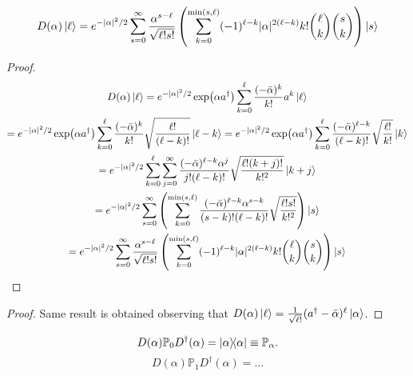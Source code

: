 \documentclass[a4paper]{report}
\newcommand{\PP}{\mathbb{P}}
\begin{document}
\begin{prop}
	\begin{equation}
		D(\alpha) \ket \ell
		= e^{-|\alpha|^2/2}
		\sum_{s=0}^\infty \frac{\alpha^{s-\ell}}{\sqrt{\ell!s!}}
		\left(
		\sum_{k=0}^{\min(s,\ell)}
		(-1)^{\ell-k}|\alpha|^{2(\ell-k)} k!\binom{\ell}{k}\binom{s}{k}
		\right)
		\ket{s}
	\end{equation}
\end{prop}

\begin{proof}
	\begin{equation}
	\begin{gathered}
		D(\alpha) \ket \ell
		= e^{-|\alpha|^2/2}
		\exp(\alpha a^\dagger) 
		\sum_{k=0}^\ell \frac{(-\bar\alpha)^k}{k!} a^k \ket\ell \\
		= e^{-|\alpha|^2/2}
		\exp(\alpha a^\dagger) 
		\sum_{k=0}^\ell \frac{(-\bar\alpha)^k}{k!} \sqrt{\frac{\ell!}{(\ell-k)!}} \ket{\ell-k}
		= e^{-|\alpha|^2/2}
		\exp(\alpha a^\dagger) 
		\sum_{k=0}^\ell
		\frac{(-\bar\alpha)^{\ell-k}}{(\ell-k)!} \sqrt{\frac{\ell!}{k!}} \ket{k} \\
		= e^{-|\alpha|^2/2}
		\sum_{k=0}^\ell\sum_{j=0}^\infty
		\frac{(-\bar\alpha)^{\ell-k} \alpha^j}{j!(\ell-k)!} \sqrt{\frac{\ell!(k+j)!}{k!^2}} \ket{k+j} \\
		= e^{-|\alpha|^2/2}
		\sum_{s=0}^\infty \left(
			\sum_{k=0}^{\min(s,\ell)}
			\frac{(-\bar\alpha)^{\ell-k} \alpha^{s-k}}{(s-k)!(\ell-k)!} \sqrt{\frac{\ell!s!}{k!^2}} 
		\right) \ket{s} \\
		= e^{-|\alpha|^2/2}
		\sum_{s=0}^\infty \frac{\alpha^{s-\ell}}{\sqrt{\ell!s!}}
		\left(
		\sum_{k=0}^{\min(s,\ell)}
		(-1)^{\ell-k}|\alpha|^{2(\ell-k)} k!\binom{\ell}{k}\binom{s}{k}
		\right)
		\ket{s} 
	\end{gathered}
	\end{equation}
\end{proof}
\begin{proof}
	Same result is obtained observing that
	$D(\alpha)\ket\ell=\frac{1}{\sqrt{\ell!}}(a^\dagger-\bar\alpha)^\ell \ket\alpha$.
\end{proof}

\begin{prop}
	\begin{equation}
		D(\alpha)\PP_0 D^\dagger(\alpha) = \ketbra\alpha \equiv \PP_\alpha.
	\end{equation}
	\begin{equation}
		D(\alpha)\PP_1 D^\dagger(\alpha)
		= ...
	\end{equation}
\end{prop}
\end{document}
